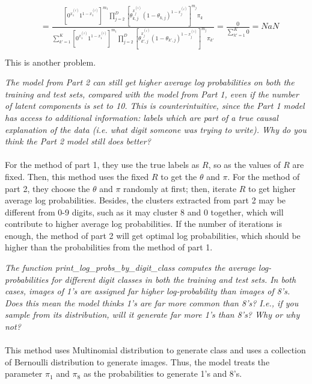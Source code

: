 \documentclass{myhw}
\begin{document}
\begin{homeworkProblem}
\begin{homeworkSection}
\begin{gather*}
\begin{aligned}
& = \frac{  [ 0^{x_1^{(i)}} 1^{1-x_1^{(i)}} ]^{m_1} \prod_{j=2}^D [ \theta_{k,j}^{x_j^{(i)}} (1-\theta_{k,j})^{1-x_j^{(i)}} ]^{m_j} \pi_k }{ \sum_{k'=1}^K [ 0^{x_1^{(i)}} 1^{1-x_1^{(i)}} ]^{m_1} \prod_{j=2}^D [ \theta_{k',j}^{x_j^{(i)}} (1-\theta_{k',j})^{1-x_j^{(i)}} ]^{m_j} \pi_{k'}} = \frac{0}{\sum_{k'=1}^K 0} = NaN \\
\end{aligned}
\end{gather*}
This is another problem. 
\end{homeworkSection}
\begin{homeworkSection}	
\emph{The model from Part 2 can still get higher average log probabilities on both the training and test sets, compared with the model from Part 1, even if the number of latent components is set to 10. This is counterintuitive, since the Part 1 model has access to additional information: labels which are part of a true causal explanation of the data (i.e. what digit someone was trying to write). Why do you think the Part 2 model still does better?} \\
\\
For the method of part 1, they use the true labels as $R$, so as the values of $R$ are fixed. Then, this method uses the fixed $R$ to get the $\theta$ and $\pi$. 
For the method of part 2, they choose the $\theta$ and $\pi$ randomly at first; then, iterate $R$ to get higher average log probabilities. Besides, the clusters extracted from part 2 may be different from 0-9 digits, such as it may cluster 8 and 0 together, which will contribute to higher average log probabilities.
If the number of iterations is enough, the method of part 2 will get optimal log probabilities, which should be higher than the probabilities from the method of part 1. 
\end{homeworkSection}
\begin{homeworkSection}	
\emph{The function print\_log\_probs\_by\_digit\_class computes the average log-probabilities for different digit classes in both the training and test sets. In both cases, images of 1’s are assigned far higher log-probability than images of 8’s. Does this mean the model thinks 1’s are far more common than 8’s? I.e., if you sample from its distribution, will it generate far more 1’s than 8’s? Why or why not?} \\
\\
This method uses Multinomial distribution to generate class and uses a collection of Bernoulli distribution to generate images. Thus, the model treats the parameter $\pi_1$ and $\pi_8$ as the probabilities to generate 1's and 8's. 

\end{homeworkSection}
\end{homeworkProblem}
\end{document}
